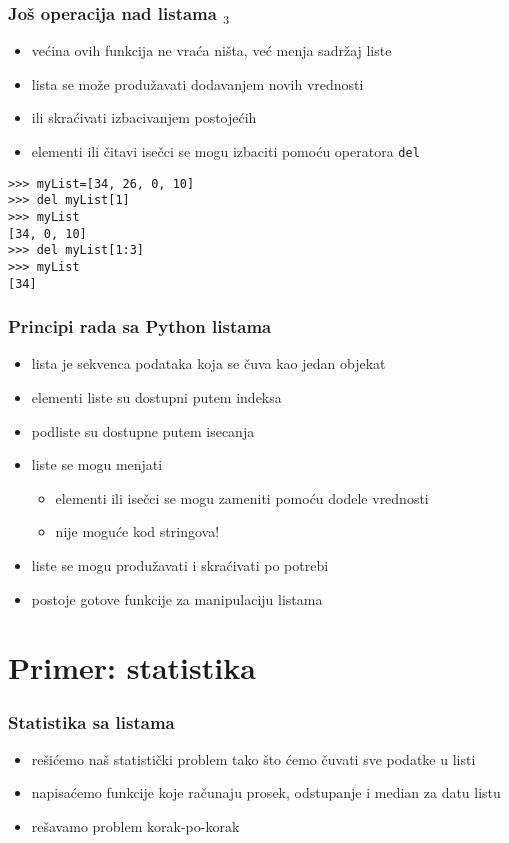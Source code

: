 \documentclass[utf8,compress,aspectratio=169]{beamer}
\begin{document}
\begin{frame}[fragile]
  \frametitle{Još operacija nad listama $_3$}
  \begin{itemize}
    \item većina ovih funkcija ne vraća ništa, već menja sadržaj liste
    \item lista se može produžavati dodavanjem novih vrednosti
    \item ili skraćivati izbacivanjem postojećih
    \item elementi ili čitavi isečci se mogu izbaciti pomoću operatora \texttt{del}
  \end{itemize}
\begin{verbatim}
>>> myList=[34, 26, 0, 10]
>>> del myList[1]
>>> myList
[34, 0, 10]
>>> del myList[1:3]
>>> myList
[34]
\end{verbatim}
\end{frame}

\begin{frame}[fragile]
  \frametitle{Principi rada sa Python listama}
  \begin{itemize}
    \item lista je sekvenca podataka koja se čuva kao jedan objekat
    \item elementi liste su dostupni putem indeksa
    \item podliste su dostupne putem isecanja
    \item liste se mogu menjati
    \begin{itemize}
      \item elementi ili isečci se mogu zameniti pomoću dodele vrednosti
      \item nije moguće kod stringova!
    \end{itemize}
    \item liste se mogu produžavati i skraćivati po potrebi
    \item postoje gotove funkcije za manipulaciju listama
  \end{itemize}
\end{frame}

\section[Primer]{Primer: statistika}

\begin{frame}[fragile]
  \frametitle{Statistika sa listama}
  \begin{itemize}
    \item rešićemo naš statistički problem tako što ćemo čuvati sve podatke u listi
    \item napisaćemo funkcije koje računaju prosek, odstupanje i median za datu listu
    \item rešavamo problem korak-po-korak
  \end{itemize}
\end{frame}
\end{document}

